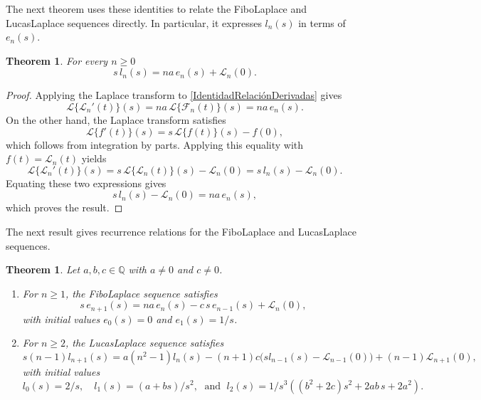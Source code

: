 \documentclass[11pt]{amsart}
\newcommand{\Ft}[1]{\mathscr{F}_{#1}}
\newcommand{\Lt}[1]{\mathscr{L}_{#1}}
\theoremstyle{plain}
\numberwithin{equation}{section}
\newtheorem{theorem}[thm]{Theorem}
\begin{document}
The next theorem uses these identities to relate the FiboLaplace and LucasLaplace sequences directly. In particular, it expresses $l_n(s)$ in terms of $e_n(s)$.


\begin{theorem}\label{Relacion:e_nyl_n}
For every $n\ge 0$
\[
s\,l_n(s)=na\,e_n(s)+\Lt{n}(0).
\]
\end{theorem}

\begin{proof}
Applying the Laplace transform to
\eqref{IdentidadRelaciónDerivadas} gives
\[
\mathcal{L}\{\Lt{n}'(t)\}(s)
=
na\,\mathcal{L}\{\Ft{n}(t)\}(s)
=
na\,e_n(s).
\]
On the other hand,  the Laplace transform satisfies 
\[\mathcal{L}\{f'(t)\}(s)=s\,\mathcal{L}\{f(t)\}(s)-f(0),\]
which follows from integration by parts. Applying this equality  with $f(t)=\Lt{n}(t)$ yields 
\[
\mathcal{L}\{\Lt{n}'(t)\}(s)=s\,\mathcal{L}\{\Lt{n}(t)\}(s)-\Lt{n}(0)=s\,l_n(s)-\Lt{n}(0).
\]
Equating these two expressions gives
\[
s\,l_n(s)-\Lt{n}(0)=na\,e_n(s),
\]
which proves the result.
\end{proof}

The next result gives recurrence relations for the FiboLaplace and LucasLaplace sequences.

\begin{theorem}\label{en-recursiva}
Let $a,b,c\in\mathbb{Q}$ with $a\neq 0$ and $c\neq 0$.
\begin{enumerate}
\item\label{en-recursivaPart1}
For $n\geq 1$, the FiboLaplace sequence satisfies
\[
s\,e_{n+1}(s)=na\,e_n(s)-c\,s\,e_{n-1}(s)+\Lt{n}(0),
\]
with initial values $e_0(s)=0$ and $e_1(s)=1/s$.

\item\label{en-recursivaPart2}
For $n\geq 2$, the LucasLaplace sequence satisfies
\[
s(n-1)l_{n+1}(s)
= a(n^{2}-1)l_n(s)
-(n+1)c\bigl(sl_{n-1}(s)-\Lt{n-1}(0)\bigr)
+(n-1)\Lt{n+1}(0),
\]
with initial values $$l_0(s)=2/s, \quad l_1(s)=(a+bs)/s^2,\; \text{ and } \; l_2(s)=1/s^3((b^2+2c)s^2+2ab\,s+2a^2).$$
\end{enumerate}
\end{theorem}
\end{document}
